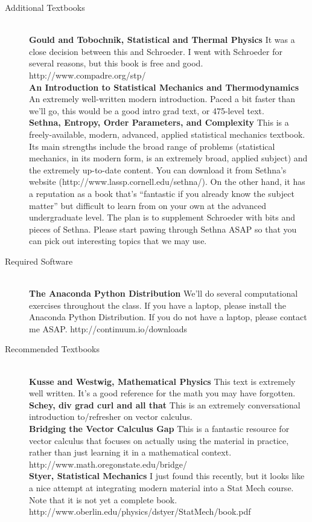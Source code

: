 \documentclass[12pt]{article}
\begin{document}
\begin{description}
\item[Additional Textbooks]
 \hfill \\
\textbf{Gould and Tobochnik, Statistical and Thermal Physics} It was a
close decision between this and Schroeder. I went with Schroeder for
several reasons, but this book is free and good.
http://www.compadre.org/stp/
\\
\textbf{An Introduction to Statistical Mechanics and Thermodynamics} An 
extremely well-written modern introduction. Paced a bit faster than we'll go,
this would be a good intro grad text, or 475-level text.
\\
\textbf{Sethna, Entropy, Order Parameters, and Complexity}
This is a freely-available, modern, advanced, applied statistical
mechanics textbook. Its main strengths include the broad range of
problems (statistical mechanics, in its modern form, is an extremely
broad, applied subject) and the extremely up-to-date content. You can
download it from Sethna's website
(http://www.lassp.cornell.edu/sethna/). On the other hand, it has a
reputation as a book that's ``fantastic if you already know the
subject matter'' but difficult to learn from on your own at the
advanced undergraduate level. The plan is to supplement Schroeder with
bits and pieces of Sethna. Please start pawing through Sethna ASAP so
that you can pick out interesting topics that we may use. \hfill \\
\item[Required Software] \hfill\\
\textbf{The Anaconda Python Distribution}
We'll do several computational exercises throughout the class. If you
have a laptop, please install the Anaconda Python Distribution. If you do not
have a laptop, please contact me ASAP. 
http://continuum.io/downloads
\item[Recommended Textbooks] \hfill \\
\textbf{Kusse and Westwig, Mathematical Physics}
This text is extremely well written. It's a good reference for the
math you may have forgotten. \\
\textbf{Schey, div grad curl and all that}
This is an extremely conversational introduction to/refresher on
vector calculus. \hfill \\
\textbf{Bridging the Vector Calculus Gap} This is a fantastic resource
for vector calculus that focuses on actually using the material in
practice, rather than just learning it in a mathematical
context. http://www.math.oregonstate.edu/bridge/ 
\\
\textbf{Styer, Statistical Mechanics} I just found this recently, but
it looks like a nice attempt at integrating modern material into a
Stat Mech course. Note that it is not yet a complete
book. http://www.oberlin.edu/physics/dstyer/StatMech/book.pdf
\end{description}
\end{document}
